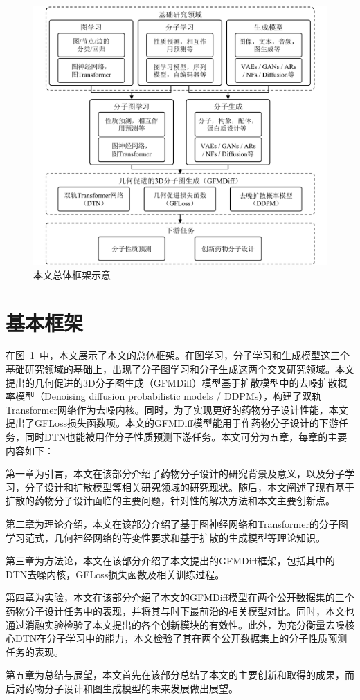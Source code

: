 \begin{figure}[h]
    \centering
    \includegraphics[width=\linewidth]{figures/overall_structure.png}
    \caption{本文总体框架示意}
    \label{fig:oa_struc}
  \end{figure}

\section{基本框架}
在图~\ref{fig:oa_struc}~中，本文展示了本文的总体框架。在图学习，分子学习和生成模型这三个基础研究领域的基础上，出现了分子图学习和分子生成这两个交叉研究领域。本文提出的几何促进的3D分子图生成（GFMDiff）模型基于扩散模型中的去噪扩散概率模型（Denoising diffusion probabilistic models / DDPMs），构建了双轨Transformer网络作为去噪内核。同时，为了实现更好的药物分子设计性能，本文提出了GFLoss损失函数项。本文的GFMDiff模型能用于作药物分子设计的下游任务，同时DTN也能被用作分子性质预测下游任务。本文可分为五章，每章的主要内容如下：

第一章为引言，本文在该部分介绍了药物分子设计的研究背景及意义，以及分子学习，分子设计和扩散模型等相关研究领域的研究现状。随后，本文阐述了现有基于扩散的药物分子设计面临的主要问题，针对性的解决方法和本文主要创新点。

第二章为理论介绍，本文在该部分介绍了基于图神经网络和Transformer的分子图学习范式，几何神经网络的等变性要求和基于扩散的生成模型等理论知识。

第三章为方法论，本文在该部分介绍了本文提出的GFMDiff框架，包括其中的DTN去噪内核，GFLoss损失函数及相关训练过程。

第四章为实验，本文在该部分介绍了本文的GFMDiff模型在两个公开数据集的三个药物分子设计任务中的表现，并将其与时下最前沿的相关模型对比。同时，本文也通过消融实验检验了本文提出的各个创新模块的有效性。此外，为充分衡量去噪核心DTN在分子学习中的能力，本文检验了其在两个公开数据集上的分子性质预测任务的表现。

第五章为总结与展望，本文首先在该部分总结了本文的主要创新和取得的成果，而后对药物分子设计和图生成模型的未来发展做出展望。